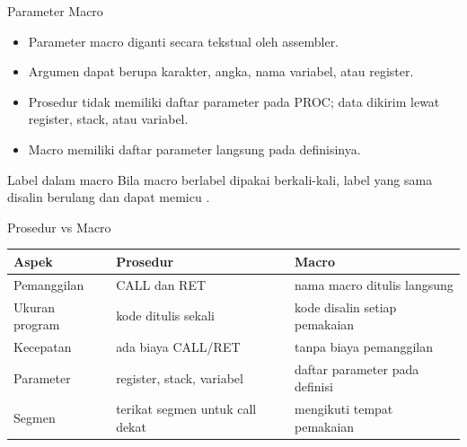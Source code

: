 \documentclass[aspectratio=169,11pt]{beamer}
\begin{document}
\begin{frame}{Parameter Macro}
\small
\begin{itemize}
    \item Parameter macro diganti secara tekstual oleh assembler.

    \vspace{0.18em}
    \item Argumen dapat berupa karakter, angka, nama variabel, atau
          register.

    \vspace{0.18em}
    \item Prosedur tidak memiliki daftar parameter pada PROC; data
          dikirim lewat register, stack, atau variabel.

    \vspace{0.18em}
    \item Macro memiliki daftar parameter langsung pada definisinya.
\end{itemize}

\vspace{0.2em}
\begin{alertblock}{Label dalam macro}
\small Bila macro berlabel dipakai berkali-kali, label yang sama
disalin berulang dan dapat memicu .
\end{alertblock}
\end{frame}

\begin{frame}{Prosedur vs Macro}
\footnotesize
\begin{center}
\begin{tabular}{@{}>{\raggedright\arraybackslash}p{3.0cm}
    >{\raggedright\arraybackslash}p{5.0cm}
    >{\raggedright\arraybackslash}p{4.8cm}@{}}
    \toprule
    \textbf{Aspek} & \textbf{Prosedur} & \textbf{Macro} \\
    \midrule
    Pemanggilan & CALL dan RET & nama macro ditulis langsung \\
    \addlinespace
    Ukuran program & kode ditulis sekali &
    kode disalin setiap pemakaian \\
    \addlinespace
    Kecepatan & ada biaya CALL/RET & tanpa biaya pemanggilan \\
    \addlinespace
    Parameter & register, stack, variabel &
    daftar parameter pada definisi \\
    \addlinespace
    Segmen & terikat segmen untuk call dekat &
    mengikuti tempat pemakaian \\
    \bottomrule
\end{tabular}
\end{center}
\end{frame}
\end{document}
